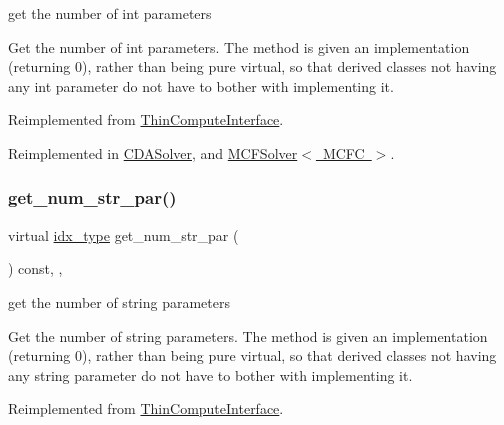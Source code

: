 get the number of int parameters 

Get the number of int parameters. The method is given an implementation (returning 0), rather than being pure virtual, so that derived classes not having any int parameter do not have to bother with implementing it. 

Reimplemented from \mbox{\hyperlink{class_s_m_spp__di__unipi__it_1_1_thin_compute_interface_a1e009f6b43f7966bf4b4740e0b4cff58}{Thin\+Compute\+Interface}}.



Reimplemented in \mbox{\hyperlink{class_s_m_spp__di__unipi__it_1_1_c_d_a_solver_a3ad74d9506761eb2ca4c8a936fb7a1c5}{C\+D\+A\+Solver}}, and \mbox{\hyperlink{class_s_m_spp__di__unipi__it_1_1_m_c_f_solver_a3ad74d9506761eb2ca4c8a936fb7a1c5}{M\+C\+F\+Solver$<$ M\+C\+F\+C $>$}}.

\mbox{\label{class_s_m_spp__di__unipi__it_1_1_solver_a91f0341f09d59b3023fc95122a625125}} 
\subsubsection{\texorpdfstring{get\+\_\+num\+\_\+str\+\_\+par()}{get\_num\_str\_par()}}
{\footnotesize\ttfamily virtual \mbox{\hyperlink{class_s_m_spp__di__unipi__it_1_1_thin_compute_interface_aa3d710629ad8c434286726ad810c3b47}{idx\+\_\+type}} get\+\_\+num\+\_\+str\+\_\+par (\begin{DoxyParamCaption}\item[{void}]{ }\end{DoxyParamCaption}) const\hspace{0.3cm}{\ttfamily [inline]}, {\ttfamily [override]}, {\ttfamily [virtual]}}



get the number of string parameters 

Get the number of string parameters. The method is given an implementation (returning 0), rather than being pure virtual, so that derived classes not having any string parameter do not have to bother with implementing it. 

Reimplemented from \mbox{\hyperlink{class_s_m_spp__di__unipi__it_1_1_thin_compute_interface_a23ef8ba7477625aec4a54dddff053468}{Thin\+Compute\+Interface}}.

